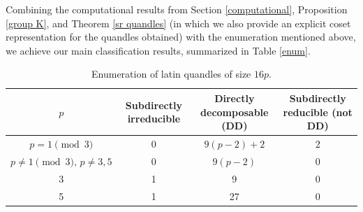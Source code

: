 \documentclass[a4paper, english, 9pt]{amsart}
\theoremstyle{plain}
\newtheorem*{theorem*}{Theorem}
\theoremstyle{definition}
\def\aut#1{\mathrm{Aut}(#1)}
\def\fix{\mathrm{Fix}}
\begin{document}
Combining the computational results from Section \ref{computational}, Proposition \ref{group K}, and Theorem \ref{sr quandles} (in which we also provide an explicit coset representation for the quandles obtained) with the enumeration mentioned above, we achieve our main classification results, summarized in Table \eqref{enum}.






\begin{table}[ht]
  \centering
  \begin{tabular}{cccc} 
    \toprule
    $p$ & Subdirectly irreducible & Directly decomposable (DD) & Subdirectly reducible (not DD) \\
    \midrule
    $p=1\pmod{3}$ & 0 & $9(p-2)+2$ & $2$ \\
    $p\neq 1\pmod{3}, \, p\neq 3,5 $ & 0 & $9(p-2)$ & 0 \\
    3 & 1 & 9 & 0 \\
    5 & 1 & 27 & 0 \\
    \bottomrule
  \end{tabular}\caption{Enumeration of latin quandles of size $16p$.}\label{enum}
\end{table}




%
\end{document}
